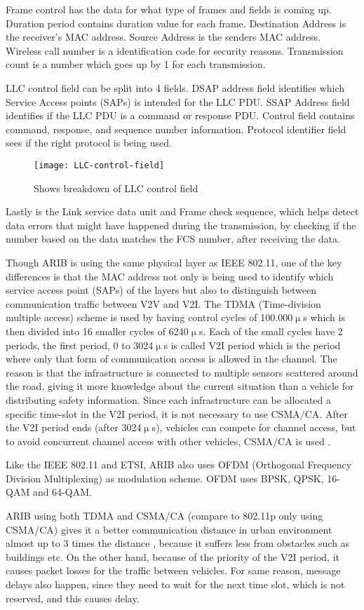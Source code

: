 Frame control has the data for what type of frames and fields is coming up. Duration period contains duration value for each frame. Destination Address is the receiver's MAC address. Source Address is the senders MAC address. Wireless call number is a identification code for security reasons. Transmission count is a number which goes up by 1 for each transmission. 

LLC control field can be split into 4 fields. DSAP address field identifies which Service Access points (SAPs) is intended for the LLC PDU. SSAP Address field identifies if the LLC PDU is a command or response PDU. Control field contains command, response, and sequence number information. Protocol identifier field sees if the right protocol is being used.
\begin{figure}[h]
    \centering
    \texttt{[image: LLC-control-field]}
    \caption{Shows breakdown of LLC control field}
    \label{fig:LLC}
\end{figure}
Lastly is the Link service data unit and Frame check sequence, which helps detect data errors that might have happened during the transmission, by checking if the number based on the data matches the FCS number, after receiving the data. 
\par
% 
Though ARIB is using the same physical layer as IEEE 802.11, one of the key differences is that the MAC address not only is being used to identify which service access point (SAPs) of the layers but also to distinguish between communication traffic between V2V and V2I. The TDMA (Time-division multiple access) scheme is used by having control cycles of 100.000$\upmu$s which is then divided into 16 smaller cycles of  6240$\upmu$s. Each of the small cycles have 2 periods, the first period, 0 to 3024$\upmu$s is called V2I period which is the period where only that form of communication access is allowed in the channel. The reason is that the infrastructure is connected to multiple sensors scattered around the road, giving it more knowledge about the current situation than a vehicle for distributing safety information. Since each infrastructure can be allocated a specific time-slot in the V2I period, it is not necessary to use CSMA/CA. After the V2I period ends (after 3024$\upmu$s), vehicles can compete for channel access, but to avoid concurrent channel access with other vehicles, CSMA/CA is used \cite{Heinovski2016PerformanceSTD-T109}.\par
% 
Like the IEEE 802.11 and ETSI, ARIB also uses OFDM (Orthogonal Frequency Division 
Multiplexing) as modulation scheme. OFDM uses BPSK, QPSK, 16-QAM and 64-QAM\footnotemark.\par
% 
% 
ARIB using both TDMA and CSMA/CA (compare to 802.11p only using CSMA/CA) gives it a better communication distance in urban environment almost up to 3 times the distance \cite{Heinovski2016PerformanceSTD-T109}, because it suffers less from obstacles such as buildings etc. On the other hand, because of the priority of the V2I period, it causes packet losses for the traffic between vehicles. For same reason, message delays also happen, since they need to wait for the next time slot, which is not reserved, and this causes delay. 
